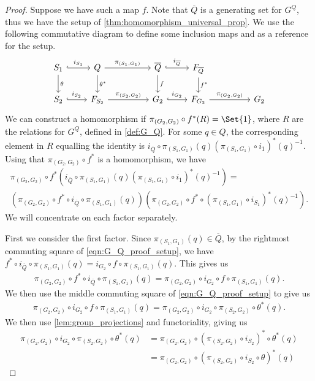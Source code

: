 \begin{proof}
	Suppose we have such a map $f$.
	Note that  $\overline{Q}$ is a generating set for  $G^Q$, thus we have the setup of \cref{thm:homomorphism_universal_prop}.
	We use the following commutative diagram to define some inclusion maps and as a reference for the setup.
	\begin{equation}
		\begin{tikzcd}
			S_1 \ar[d, "\theta"] \ar[r, hook, "i_{S_1}"] & Q \ar[d, "\theta^*"] \ar[rr, "\pi_{(S_1, G_1)}"] & & \overline{Q} \ar[d, "f"] \ar[r, hook, "i_{\overline{Q}}"] & F_{\overline{Q}} \ar[d, "f^*"]
			\\ S_2 \ar[r, hook, "i_{S_2}"] & F_{S_2} \ar[rr, "\pi_{(S_2, G_2)}"] & & G_2 \ar[r, hook, "i_{G_2}"] & F_{G_2} \ar[rr, "\pi_{(G_2, G_2)}"] & & G_2
		\end{tikzcd}
		\label{eqn:G_Q_proof_setup}
	\end{equation}
	We can construct a homomorphism if $\pi_{(G_2, G_2)} \circ f^*(R) = \Set{1}$, where $R$ are the relations for $G^Q$, defined in \cref{def:G_Q}.
	For some $q \in Q$, the corresponding element in $R$ equalling the identity is  $i_{\overline{Q}} \circ \pi_{(S_1,G_1)}(q)(\pi_{(S_1,G_1)} \circ i_1)^*(q)^{-1}$.
	Using that $\pi_{(G_2,G_2)} \circ f^*$ is a homomorphism, we have
	\begin{align*}
		\pi_{(G_2,G_2)} \circ f^* \left(i_{\overline{Q}} \circ \pi_{(S_1,G_1)}(q)(\pi_{(S_1,G_1)} \circ i_1)^*(q)^{-1}\right) =
		\\ \left(\pi_{(G_2,G_2)} \circ f^* \circ i_{\overline{Q}} \circ \pi_{(S_1,G_1)} (q)\right) \left( \pi_{(G_2,G_2)} \circ f^* \circ\left( \pi_{(S_1,G_1)} \circ i_{S_1}\right)^*(q)^{-1} \right).
	\end{align*}
	We will concentrate on each factor separately.

	First we consider the first factor.
	Since $\pi_{(S_1, G_1)}(q) \in \overline{Q}$, by the rightmost commuting square of \eqref{eqn:G_Q_proof_setup}, we have $f^* \circ i_{\overline{Q}} \circ \pi_{(S_1, G_1)}(q) = i_{G_2} \circ f \circ \pi_{(S_1,G_1)} (q)$.
	This gives us
	\begin{align*}
		\pi_{(G_2,G_2)} \circ f^* \circ i_{\overline{Q}} \circ \pi_{(S_1,G_1)} (q) = \pi_{(G_2,G_2)} \circ i_{G_2} \circ f \circ \pi_{(S_1,G_1)}(q).
	\end{align*}
	We then use the middle commuting square of \eqref{eqn:G_Q_proof_setup} to give us
	\begin{align*}
		\pi_{(G_2,G_2)} \circ i_{G_2} \circ f \circ \pi_{(S_1,G_1)}(q) = \pi_{(G_2,G_2)} \circ i_{G_2} \circ \pi_{(S_2,G_2)} \circ \theta^*(q).
	\end{align*}
	We then use \cref{lem:group_projections} and functoriality, giving us
	\begin{align*}
		\pi_{(G_2,G_2)} \circ i_{G_2} \circ \pi_{(S_2,G_2)} \circ \theta^*(q) & = \pi_{(G_2,G_2)} \circ \left( \pi_{(S_2,G_2)} \circ i_{S_2} \right)^*  \circ \theta^*(q)
		\\ &= \pi_{(G_2,G_2)} \circ \left( \pi_{(S_2,G_2)} \circ i_{S_2} \circ \theta \right)^*(q)
	\end{align*}


\end{proof}
